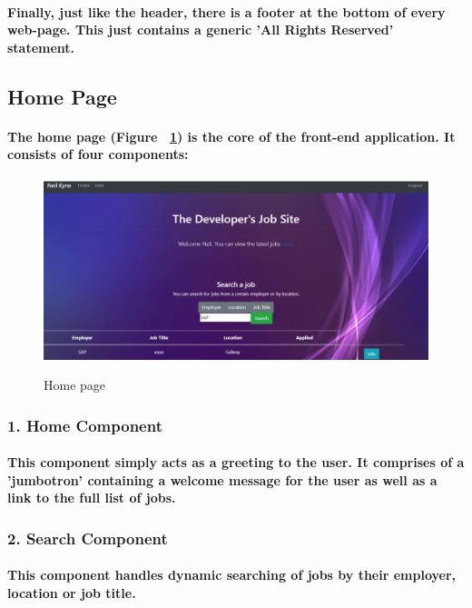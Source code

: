 \paragraph{Finally, just like the header, there is a footer at the bottom of every web-page. This just contains a generic 'All Rights Reserved' statement.}

\subsection{Home Page}
\paragraph{The home page (Figure ~\ref{home_label}) is the core of the front-end application. It consists of four components:}
\begin{figure}[ht]
    \centering
    \includegraphics[scale=0.3]{Images/home.png} 
    \label{home_label}
    \caption{Home page}
\end{figure}
\subsubsection{1. Home Component}
\paragraph{This component simply acts as a greeting to the user. It comprises of a 'jumbotron' containing a welcome message for the user as well as a link to the full list of jobs.}
\subsubsection{2. Search Component}
\paragraph{This component handles dynamic searching of jobs by their employer, location or job title.}
